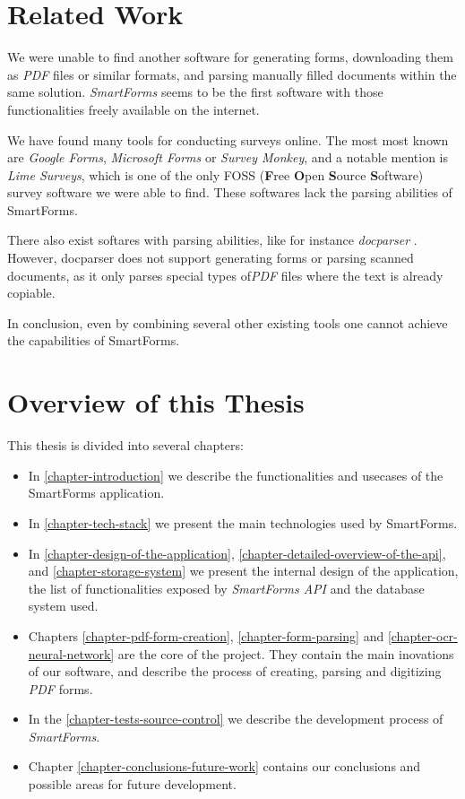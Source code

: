 \documentclass[11pt, a4paper]{report}
\begin{document}
\section{Related Work}

We were unable to find another software for generating forms, downloading them as \textit{PDF} files or similar formats, and parsing manually filled documents within the same solution. \textit{SmartForms} seems to be the first software with those functionalities freely available on the internet.

We have found many tools for conducting surveys online. The most most known are \textit{Google Forms}, \textit{Microsoft Forms} or \textit{Survey Monkey}, and a notable mention is \textit{Lime Surveys}, which is one of the only FOSS (\textbf Free \textbf Open \textbf Source \textbf Software) survey software we were able to find\cite {limesurveys}. These softwares lack the parsing abilities of SmartForms.

There also exist softares with parsing abilities, like for instance \textit{docparser} \cite{docparser}. However, docparser does not support generating forms or parsing scanned documents, as it only parses special types of\textit{PDF} files where the text is already copiable. 

In conclusion, even by combining several other existing tools one cannot achieve the capabilities of SmartForms.

\section{Overview of this Thesis}

This thesis is divided into several chapters:
\begin{itemize}
	\item In \autoref{chapter-introduction} we describe the functionalities and usecases of the SmartForms application.
	\item In \autoref{chapter-tech-stack} we present the main technologies used by SmartForms.
	\item In \autoref{chapter-design-of-the-application}, \autoref{chapter-detailed-overview-of-the-api}, and \autoref{chapter-storage-system} we present the internal design of the application, the list of functionalities exposed by \textit{SmartForms API} and the database system used.
	\item Chapters \ref{chapter-pdf-form-creation}, \ref{chapter-form-parsing} and \ref{chapter-ocr-neural-network} are the core of the project. They contain the main inovations of our software, and describe the process of creating, parsing and digitizing \textit{PDF} forms.
	\item In the \autoref{chapter-tests-source-control} we describe the development process of \textit{SmartForms}.
	\item Chapter \ref{chapter-conclusions-future-work} contains our conclusions and possible areas for future development.
\end{itemize}
\end{document}
